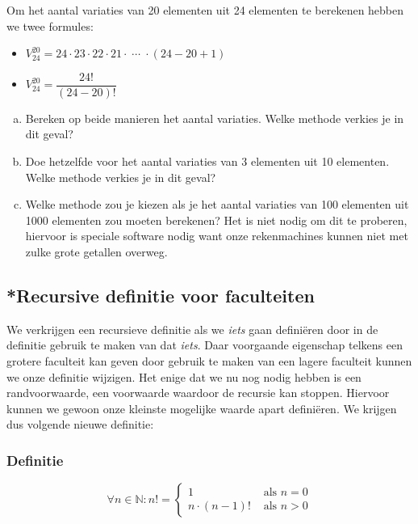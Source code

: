 \documentclass[12pt,a4paper,twoside]{article}
\begin{document}
\begin{oefening}
Om het aantal variaties van 20 elementen uit 24 elementen te berekenen hebben we twee formules:\\
\begin{itemize}
  \itemsep1em
  \item $\displaystyle V^{20}_{24}=24\cdot23\cdot22\cdot21\cdot\;\cdots\;\cdot(24-20+1)$
  \item $\displaystyle V^{20}_{24}=\dfrac{24!}{(24-20)!}$
\end{itemize}
\begin{enumerate}[(a)]
  \item Bereken op beide manieren het aantal variaties. Welke methode verkies je in dit geval?
  \item Doe hetzelfde voor het aantal variaties van 3 elementen uit 10 elementen. Welke methode verkies je in dit geval?
  \item Welke methode zou je kiezen als je het aantal variaties van 100 elementen uit 1000 elementen zou moeten berekenen? Het is niet nodig om dit te proberen, hiervoor is speciale software nodig want onze rekenmachines kunnen niet met zulke grote getallen overweg.
\end{enumerate}
\end{oefening}

\subsection{*Recursive definitie voor faculteiten}

We verkrijgen een recursieve definitie als we {\em iets} gaan definiëren door in de definitie gebruik te maken van dat {\em iets}. Daar voorgaande eigenschap telkens een grotere faculteit kan geven door gebruik te maken van een lagere faculteit kunnen we onze definitie wijzigen. Het enige dat we nu nog nodig hebben is een randvoorwaarde, een voorwaarde waardoor de recursie kan stoppen. Hiervoor kunnen we gewoon onze kleinste mogelijke waarde apart definiëren. We krijgen dus volgende nieuwe definitie:

\subsubsection*{Definitie}
\begin{mdframed}
  \[\forall n \in \mathbb{N} : n!=
    \begin{cases}
      1        &\mbox{ als } n=0\\
      n \cdot (n-1)! &\mbox{ als } n>0
    \end{cases}
  \]
\end{mdframed}
\end{document}
